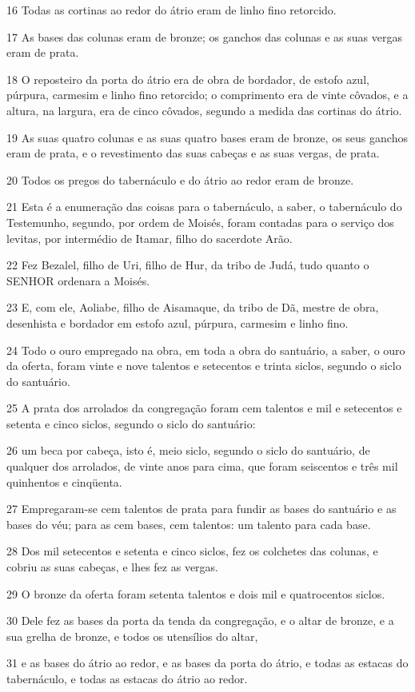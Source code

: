 \par 16 Todas as cortinas ao redor do átrio eram de linho fino retorcido.
\par 17 As bases das colunas eram de bronze; os ganchos das colunas e as suas vergas eram de prata.
\par 18 O reposteiro da porta do átrio era de obra de bordador, de estofo azul, púrpura, carmesim e linho fino retorcido; o comprimento era de vinte côvados, e a altura, na largura, era de cinco côvados, segundo a medida das cortinas do átrio.
\par 19 As suas quatro colunas e as suas quatro bases eram de bronze, os seus ganchos eram de prata, e o revestimento das suas cabeças e as suas vergas, de prata.
\par 20 Todos os pregos do tabernáculo e do átrio ao redor eram de bronze.
\par 21 Esta é a enumeração das coisas para o tabernáculo, a saber, o tabernáculo do Testemunho, segundo, por ordem de Moisés, foram contadas para o serviço dos levitas, por intermédio de Itamar, filho do sacerdote Arão.
\par 22 Fez Bezalel, filho de Uri, filho de Hur, da tribo de Judá, tudo quanto o SENHOR ordenara a Moisés.
\par 23 E, com ele, Aoliabe, filho de Aisamaque, da tribo de Dã, mestre de obra, desenhista e bordador em estofo azul, púrpura, carmesim e linho fino.
\par 24 Todo o ouro empregado na obra, em toda a obra do santuário, a saber, o ouro da oferta, foram vinte e nove talentos e setecentos e trinta siclos, segundo o siclo do santuário.
\par 25 A prata dos arrolados da congregação foram cem talentos e mil e setecentos e setenta e cinco siclos, segundo o siclo do santuário:
\par 26 um beca por cabeça, isto é, meio siclo, segundo o siclo do santuário, de qualquer dos arrolados, de vinte anos para cima, que foram seiscentos e três mil quinhentos e cinqüenta.
\par 27 Empregaram-se cem talentos de prata para fundir as bases do santuário e as bases do véu; para as cem bases, cem talentos: um talento para cada base.
\par 28 Dos mil setecentos e setenta e cinco siclos, fez os colchetes das colunas, e cobriu as suas cabeças, e lhes fez as vergas.
\par 29 O bronze da oferta foram setenta talentos e dois mil e quatrocentos siclos.
\par 30 Dele fez as bases da porta da tenda da congregação, e o altar de bronze, e a sua grelha de bronze, e todos os utensílios do altar,
\par 31 e as bases do átrio ao redor, e as bases da porta do átrio, e todas as estacas do tabernáculo, e todas as estacas do átrio ao redor.


